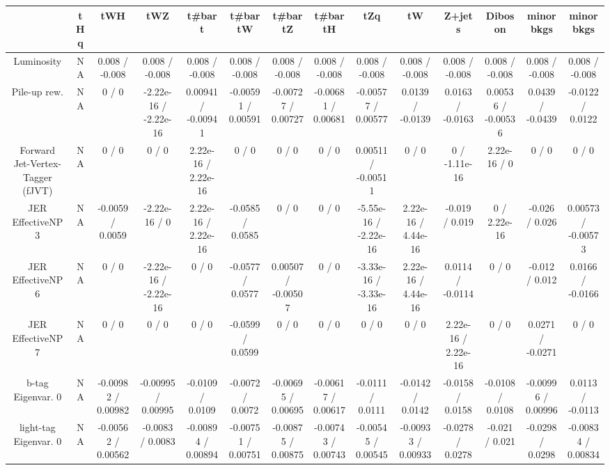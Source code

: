 \documentclass[10pt]{article}
\begin{document}
\begin{table}[htbp]
\begin{center}
\begin{tabular}{|c|c|c|c|c|c|c|c|c|c|c|c|c|c|}
\hline 
      & tHq      & tWH      & tWZ      & t#bar{t}      & t#bar{t}W      & t#bar{t}Z      & t#bar{t}H      & tZq      & tW      & Z+jets      & Diboson      & minor bkgs      & minor bkgs \\ 
\hline 
  Luminosity &    NA    & 0.008 / -0.008 & 0.008 / -0.008 & 0.008 / -0.008 & 0.008 / -0.008 & 0.008 / -0.008 & 0.008 / -0.008 & 0.008 / -0.008 & 0.008 / -0.008 & 0.008 / -0.008 & 0.008 / -0.008 & 0.008 / -0.008 & 0.008 / -0.008 \\ 
  Pile-up rew. &    NA    & 0 / 0 & -2.22e-16 / -2.22e-16 & 0.00941 / -0.00941 & -0.00591 / 0.00591 & -0.00727 / 0.00727 & -0.00681 / 0.00681 & -0.00577 / 0.00577 & 0.0139 / -0.0139 & 0.0163 / -0.0163 & 0.00536 / -0.00536 & 0.0439 / -0.0439 & -0.0122 / 0.0122 \\ 
  Forward Jet-Vertex-Tagger (fJVT) &    NA    & 0 / 0 & 0 / 0 & 2.22e-16 / 2.22e-16 & 0 / 0 & 0 / 0 & 0 / 0 & 0.00511 / -0.00511 & 0 / 0 & 0 / -1.11e-16 & 2.22e-16 / 0 & 0 / 0 & 0 / 0 \\ 
  JER EffectiveNP 3 &    NA    & -0.0059 / 0.0059 & -2.22e-16 / 0 & 2.22e-16 / 2.22e-16 & -0.0585 / 0.0585 & 0 / 0 & 0 / 0 & -5.55e-16 / -2.22e-16 & 2.22e-16 / 4.44e-16 & -0.019 / 0.019 & 0 / 2.22e-16 & -0.026 / 0.026 & 0.00573 / -0.00573 \\ 
  JER EffectiveNP 6 &    NA    & 0 / 0 & -2.22e-16 / -2.22e-16 & 0 / 0 & -0.0577 / 0.0577 & 0.00507 / -0.00507 & 0 / 0 & -3.33e-16 / -3.33e-16 & 2.22e-16 / 4.44e-16 & 0.0114 / -0.0114 & 0 / 0 & -0.012 / 0.012 & 0.0166 / -0.0166 \\ 
  JER EffectiveNP 7 &    NA    & 0 / 0 & 0 / 0 & 0 / 0 & -0.0599 / 0.0599 & 0 / 0 & 0 / 0 & 0 / 0 & 0 / 0 & 2.22e-16 / 2.22e-16 & 0 / 0 & 0.0271 / -0.0271 & 0 / 0 \\ 
  b-tag Eigenvar. 0 &    NA    & -0.00982 / 0.00982 & -0.00995 / 0.00995 & -0.0109 / 0.0109 & -0.0072 / 0.0072 & -0.00695 / 0.00695 & -0.00617 / 0.00617 & -0.0111 / 0.0111 & -0.0142 / 0.0142 & -0.0158 / 0.0158 & -0.0108 / 0.0108 & -0.00996 / 0.00996 & 0.0113 / -0.0113 \\ 
  light-tag Eigenvar. 0 &    NA    & -0.00562 / 0.00562 & -0.0083 / 0.0083 & -0.00894 / 0.00894 & -0.00751 / 0.00751 & -0.00875 / 0.00875 & -0.00743 / 0.00743 & -0.00545 / 0.00545 & -0.00933 / 0.00933 & -0.0278 / 0.0278 & -0.021 / 0.021 & -0.0298 / 0.0298 & -0.00834 / 0.00834 \\ 

\end{tabular}
\end{center}
\end{table}
\end{document}
